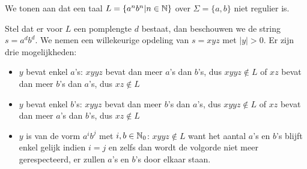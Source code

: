 We tonen aan dat een taal $L = \{a^nb^n|n \in \mathbb{N}\}$ over $\Sigma = \{a,b\}$ niet regulier is.

Stel dat er voor $L$ een pomplengte $d$ bestaat, dan beschouwen we de string $s=a^db^d$. We nemen een willekeurige opdeling van $s=xyz$ met $|y| > 0$. Er zijn drie mogelijkheden:

\begin{itemize}
\item $y$ bevat enkel $a$'s: $xyyz$ bevat dan meer $a$'s dan $b$'s, dus $xyyz \notin L$ of $xz$ bevat dan meer $b$'s dan $a$'s, dus $xz \notin L$
\item $y$ bevat enkel $b$'s: $xyyz$ bevat dan meer $b$'s dan $a$'s, dus $xyyz \notin L$ of $xz$ bevat dan meer $a$'s dan $b$'s, dus $xz \notin L$
\item $y$ is van de vorm $a^ib^j$ met $i,b \in \mathbb{N}_0$: $xyyz \notin L$ want het aantal $a$'s en $b$'s blijft enkel gelijk indien $i=j$ en zelfs dan wordt de volgorde niet meer gerespecteerd, er zullen $a$'s en $b$'s door elkaar staan.
\end{itemize}